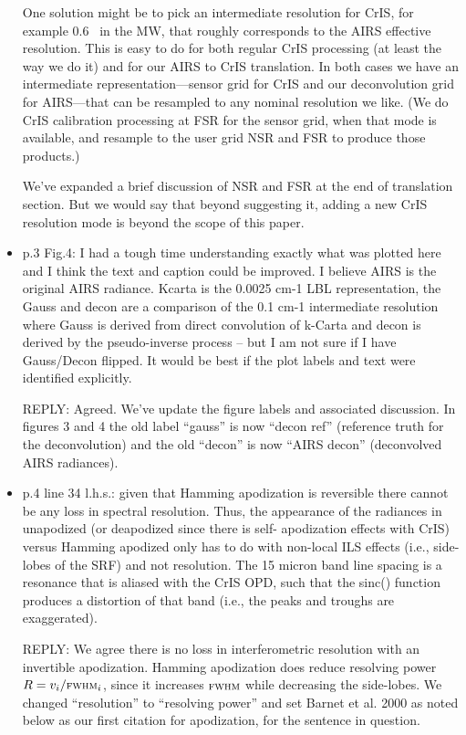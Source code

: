 \documentclass[11pt]{article}
\newcommand {\reply} {\mbox{\small REPLY}}
\begin{document}
\begin{itemize}
  One solution might be to pick an intermediate resolution for CrIS,
  for example 0.6 \wn\ in the MW, that roughly corresponds to the
  AIRS effective resolution.  This is easy to do for both regular
  CrIS processing (at least the way we do it) and for our AIRS to
  CrIS translation.  In both cases we have an intermediate
  representation---sensor grid for CrIS and our deconvolution grid
  for AIRS---that can be resampled to any nominal resolution we
  like.  (We do CrIS calibration processing at FSR for the sensor
  grid, when that mode is available, and resample to the user grid
  NSR and FSR to produce those products.)

  We've expanded a brief discussion of NSR and FSR at the end of
  translation section.  But we would say that beyond suggesting it,
  adding a new CrIS resolution mode is beyond the scope of this
  paper.

\item p.3 Fig.4: I had a tough time understanding exactly what was
  plotted here and I think the text and caption could be improved.
  I believe AIRS is the original AIRS radiance. Kcarta is the 0.0025
  cm-1 LBL representation, the Gauss and decon are a comparison of
  the 0.1 cm-1 intermediate resolution where Gauss is derived from
  direct convolution of k-Carta and decon is derived by the
  pseudo-inverse process – but I am not sure if I have Gauss/Decon
  flipped. It would be best if the plot labels and text were
  identified explicitly.

  \reply: Agreed.  We've update the figure labels and associated
  discussion.  In figures 3 and 4 the old label ``gauss'' is now
  ``decon ref'' (reference truth for the deconvolution) and the old
  ``decon'' is now ``AIRS decon'' (deconvolved AIRS radiances).

\item p.4 line 34 l.h.s.: given that Hamming apodization is
  reversible there cannot be any loss in spectral resolution. Thus,
  the appearance of the radiances in unapodized (or deapodized since
  there is self- apodization effects with CrIS) versus Hamming
  apodized only has to do with non-local ILS effects (i.e.,
  side-lobes of the SRF) and not resolution. The 15 micron band line
  spacing is a resonance that is aliased with the CrIS OPD, such
  that the sinc() function produces a distortion of that band (i.e.,
  the peaks and troughs are exaggerated).

  \reply: We agree there is no loss in interferometric resolution
  with an invertible apodization.  Hamming apodization does reduce
  resolving power $R = v_i/ \mbox{\small\textsc{fwhm}}_i$, since it increases $\mbox{\small\textsc{fwhm}}$
  while decreasing the side-lobes.  We changed ``resolution'' to
  ``resolving power'' and set Barnet et al. 2000 as noted below as
  our first citation for apodization, for the sentence in question.


\end{itemize}
\end{document}

